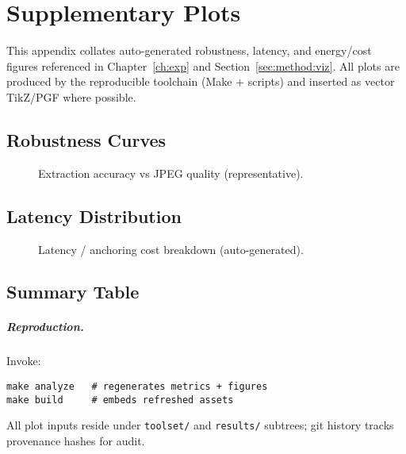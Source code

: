 \chapter{Supplementary Plots}\label{app:plots}

This appendix collates auto-generated robustness, latency, and energy/cost
figures referenced in Chapter~\ref{ch:exp} and Section~\ref{sec:method:viz}.
All plots are produced by the reproducible toolchain (Make + scripts) and
inserted as vector TikZ/PGF where possible.

\section*{Robustness Curves}
\begin{figure}[ht]
  \centering
  \caption{Extraction accuracy vs JPEG quality (representative).}\label{fig:app:robustness_curve}
\end{figure}

\section*{Latency Distribution}
\begin{figure}[ht]
  \centering
  \caption{Latency / anchoring cost breakdown (auto-generated).}\label{fig:app:anchoring_cost}
\end{figure}

\section*{Summary Table}

\paragraph{Reproduction.} Invoke:
\begin{verbatim}
make analyze   # regenerates metrics + figures
make build     # embeds refreshed assets
\end{verbatim}

All plot inputs reside under \texttt{toolset/} and \texttt{results/} subtrees; git
history tracks provenance hashes for audit.
